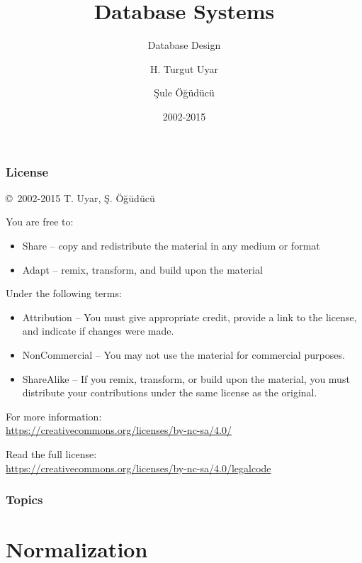 \documentclass[dvipsnames]{beamer}
\title{Database Systems}
\subtitle{Database Design}
\author{H. Turgut Uyar \and Şule Öğüdücü}
\date{2002-2015}
\begin{document}
\begin{frame}
  \titlepage
\end{frame}

\begin{frame}
  \frametitle{License}

  \hfill
  \copyright~2002-2015 T. Uyar, Ş. Öğüdücü

  \vfill
  \begin{footnotesize}
    You are free to:
    \begin{itemize}
      \itemsep0em
      \item Share -- copy and redistribute the material in any medium or format
      \item Adapt -- remix, transform, and build upon the material
    \end{itemize}

    Under the following terms:
    \begin{itemize}
      \itemsep0em
      \item Attribution -- You must give appropriate credit, provide a link to
        the license, and indicate if changes were made.

      \item NonCommercial -- You may not use the material for commercial
        purposes.

      \item ShareAlike -- If you remix, transform, or build upon the material,
        you must distribute your contributions under the same license as the
        original.
    \end{itemize}
  \end{footnotesize}

  \begin{small}
    For more information:\\
    \url{https://creativecommons.org/licenses/by-nc-sa/4.0/}

    \smallskip
    Read the full license:\\
    \url{https://creativecommons.org/licenses/by-nc-sa/4.0/legalcode}
  \end{small}
\end{frame}

\begin{frame}
  \frametitle{Topics}
  \tableofcontents
\end{frame}

\section{Normalization}
\end{document}
